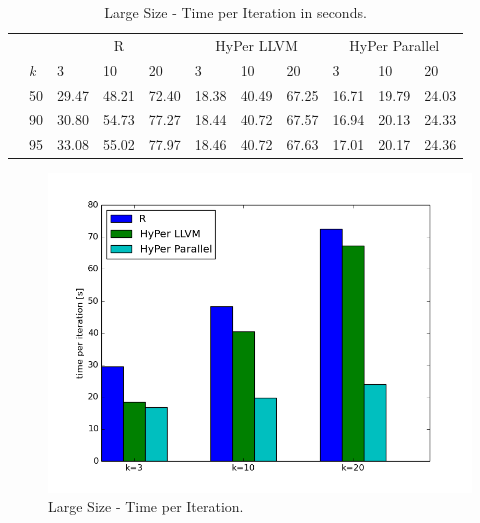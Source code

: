 \begin{table}[htsb]
  \caption[Large Size - Time per Iteration (Parallel)]{Large Size - Time per Iteration in seconds.}
  \label{tab:large_final}
  \centering
  \begin{tabular}{l l l l l |l l l |l l l }
    \toprule
      && \multicolumn{3}{c}{R} & \multicolumn{3}{c}{HyPer LLVM} & \multicolumn{3}{c}{HyPer Parallel}  \\
      &\emph{k} & 3 & 10 & 20 & 3 & 10 & 20 & 3 & 10 & 20 \\
    \midrule
      \parbox[t]{2mm}{} &50  & 29.47 & 48.21 & 72.40 & 18.38 & 40.49 & 67.25 & 16.71 & 19.79 & 24.03 \\
      &90  & 30.80 & 54.73 & 77.27 & 18.44 & 40.72 & 67.57 & 16.94 & 20.13 & 24.33 \\
      &95  & 33.08 & 55.02 & 77.97 & 18.46 & 40.72 & 67.63 & 17.01 & 20.17 & 24.36 \\
    \bottomrule
  \end{tabular}
\end{table}




\begin{figure}[htsb]
  \centering
  \includegraphics[scale=0.5, trim="0cm 1.5cm 0cm 0cm"]{figures/charts/final_150M}
  \caption[Large Size - Time per Iteration (Parallel)]{Large Size - Time per Iteration.}
  \label{fig:final_150M}
\end{figure}


